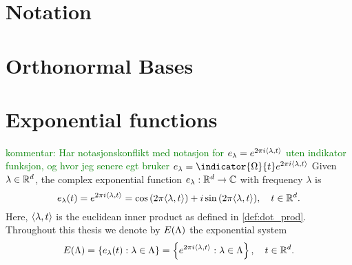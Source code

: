 \documentclass[../thesis.tex]{subfiles}
\begin{document}
\section{Notation}
    

\section{Orthonormal Bases}
    


\section{Exponential functions}
\textcolor{green}{kommentar: Har notasjonskonflikt med notasjon for $e_\lambda= e^{2 \pi i \langle \lambda, t \rangle}$ uten indikator funksjon, og hvor jeg senere egt bruker $e_\lambda=\indicator{\Omega}{t} e^{2 \pi i \inpl{t}}$}
Given $\lambda \in \mathbb{R}^d$, the complex exponential function $e_{\lambda}: \mathbb{R}^d \rightarrow \mathbb{C}$ with frequency $\lambda$ is 
\begin{equation}
    e_{\lambda}(t) = e^{2 \pi i \langle \lambda, t \rangle} = \cos{(2 \pi \langle \lambda, t \rangle)} + i \sin{(2 \pi \langle \lambda, t \rangle)}, \quad t\in \mathbb{R}^d.
\end{equation}
Here, $\langle \lambda, t \rangle$ is the euclidean inner product as defined in \cref{def:dot_prod}. Throughout this thesis we denote by $E(\Lambda)$ the exponential system
\begin{align}
    E(\Lambda) = \left\{e_\lambda(t) : \lambda \in \Lambda\right\} = \left\{e^{2\pi i \langle \lambda, t \rangle} : \lambda \in \Lambda\right\}, \quad t\in \mathbb{R}^d.
\end{align}
\end{document}
